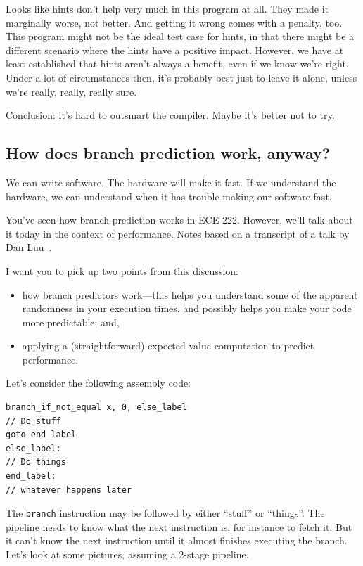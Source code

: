 \documentclass[a4paper]{report}
\begin{document}
Looks like hints don't help very much in this program at all. They made it marginally worse, not better. And getting it wrong comes with a penalty, too. This program might not be the ideal test case for hints, in that there might be a different scenario where the hints have a positive impact. However, we have at least established that hints aren't always a benefit, even if we know we're right. Under a lot of circumstances then, it's probably best just to leave it alone, unless we're really, really, really sure. 

Conclusion: it's hard to outsmart the compiler. Maybe it's better not to try.

\subsection*{How does branch prediction work, anyway?}
We can write software. The hardware will make it fast. If we understand the hardware, we can understand when it has trouble making our software fast.

You've seen how branch prediction works in ECE 222. However, we'll talk about it today in the context of performance. Notes based on a transcript of a talk by Dan Luu~\cite{branchprediction}.

I want you to pick up two points from this discussion:
\vspace*{-1em}
\begin{itemize}[noitemsep]
\item how branch predictors work---this helps you understand some of the apparent randomness in your
execution times, and possibly helps you make your code more predictable; and,
\item applying a (straightforward) expected value computation to predict performance.
\end{itemize}

Let's consider the following assembly code:

\hspace*{2em} \begin{minipage}{.4\textwidth} \begin{lstlisting}
branch_if_not_equal x, 0, else_label
// Do stuff
goto end_label
else_label:
// Do things
end_label:
// whatever happens later
\end{lstlisting}
\end{minipage}

The {\tt branch} instruction may be followed by either ``stuff'' or ``things''.
The pipeline needs to know what the next instruction is, for instance to fetch it.
But it can't know the next instruction until it almost finishes executing the branch.
Let's look at some pictures, assuming a 2-stage pipeline.
\end{document}
